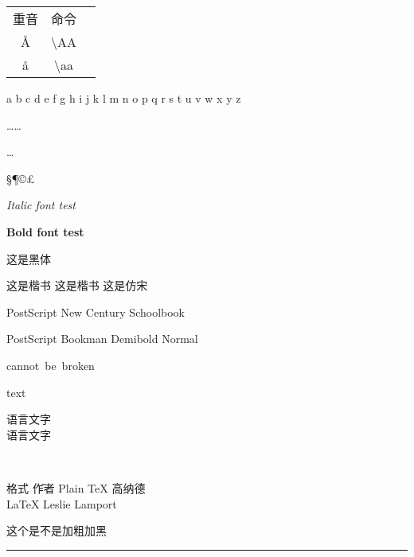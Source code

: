 \documentclass[UTF8]{ctexart}
\begin{document}
\begin{table}[H]
\begin{tabular}{|ccc|}
\hline 

重音& 命令& \\
\AA & \textbackslash AA & \\
\aa & \textbackslash aa & \\
\hline

\end{tabular}
\end{table}
\textgreek{a b c d e f g h i j k l m n o p q r s t u v w x y z}

……

\ldots

\S  \dag  \ddag  \P  \copyright  \textregistered  \texttrademark  \pounds  \textbullet

\textit{Italic font test}

{\bfseries Bold font test}

{这是黑体}

{这是楷书}
{\kaishu 这是楷书}
{\fangsong 这是仿宋}

\fontsize{14}{17}\selectfont
PostScript New Century Schoolbook

PostScript Bookman Demibold Normal

\mbox{cannot be broken}

\makebox[1em]{\textbullet} text \\

语言文字\\
语言文字

\\

\begin{tabbing}
格式 \hspace{3em} \= 作者 \kill
Plain \TeX \> 高纳德 \\
\LaTeX \> Leslie Lamport
\end{tabbing}
这个是不是加粗加黑
\rule{1em}{1em}
\end{document}
